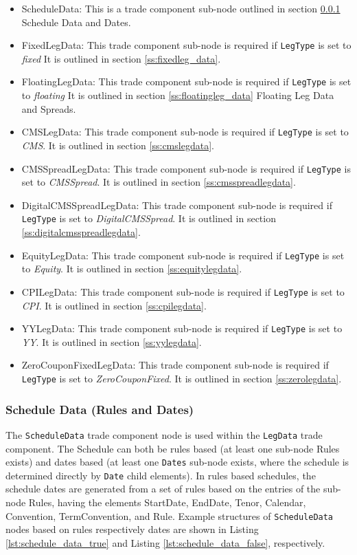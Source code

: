 \begin{itemize}
\item ScheduleData: This is a trade component sub-node outlined in section \ref{ss:schedule_data} Schedule Data and
Dates.
\item FixedLegData: This trade component sub-node is required if \lstinline!LegType! is set to \emph{fixed} It is
outlined in section \ref{ss:fixedleg_data}.
\item FloatingLegData: This trade component sub-node is required if \lstinline!LegType! is set to \emph{floating} It is
outlined in section \ref{ss:floatingleg_data} Floating Leg Data and Spreads.
\item CMSLegData: This trade component sub-node is required if \lstinline!LegType! is set to \emph{CMS}. It is
  outlined in section \ref{ss:cmslegdata}.
\item CMSSpreadLegData: This trade component sub-node is required if \lstinline!LegType! is set to \emph{CMSSpread}. It is
  outlined in section \ref{ss:cmsspreadlegdata}.
\item DigitalCMSSpreadLegData: This trade component sub-node is required if \lstinline!LegType! is set to \emph{DigitalCMSSpread}. It is
  outlined in section \ref{ss:digitalcmsspreadlegdata}.
\item EquityLegData: This trade component sub-node is required if \lstinline!LegType! is set to \emph{Equity}. It is
  outlined in section \ref{ss:equitylegdata}.    
\item CPILegData: This trade component sub-node is required if \lstinline!LegType! is set to \emph{CPI}. It is
  outlined in section \ref{ss:cpilegdata}.
\item YYLegData: This trade component sub-node is required if \lstinline!LegType! is set to \emph{YY}. It is
  outlined in section \ref{ss:yylegdata}.
\item ZeroCouponFixedLegData: This trade component sub-node is required if \lstinline!LegType! is set to \emph{ZeroCouponFixed}. It is
  outlined in section \ref{ss:zerolegdata}.
\end{itemize}

\subsubsection{Schedule Data (Rules and Dates)}\label{ss:schedule_data}

The \lstinline!ScheduleData! trade component node is used within the \lstinline!LegData! trade component. The Schedule can both be
rules based (at least one sub-node Rules exists) and dates based (at least one \lstinline!Dates! sub-node exists,
where the schedule is determined directly by \lstinline!Date! child elements). In rules based schedules, the schedule dates are generated from a
set of rules based on the entries of the sub-node Rules, having the elements StartDate, EndDate, Tenor, Calendar, Convention, TermConvention, and Rule.
Example structures of \lstinline!ScheduleData! nodes based on rules
respectively dates are shown in Listing \ref{lst:schedule_data_true} and Listing \ref{lst:schedule_data_false}, respectively.

